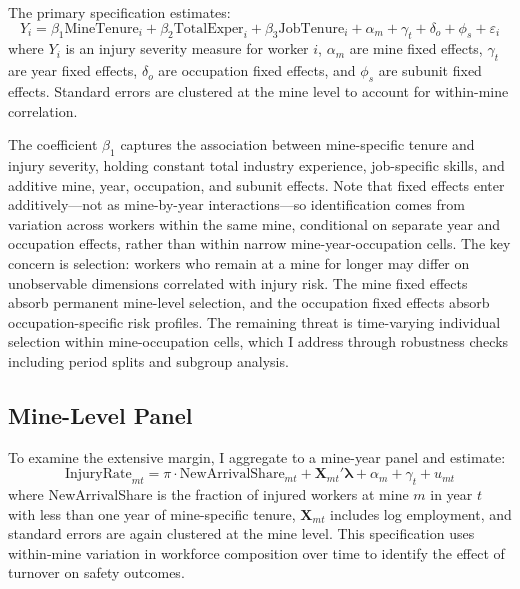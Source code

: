 \documentclass[12pt]{article}
\begin{document}
The primary specification estimates:
\begin{equation}\label{eq:main}
Y_i = \beta_1 \text{MineTenure}_i + \beta_2 \text{TotalExper}_i + \beta_3 \text{JobTenure}_i + \alpha_m + \gamma_t + \delta_o + \phi_s + \varepsilon_i
\end{equation}
where $Y_i$ is an injury severity measure for worker $i$, $\alpha_m$ are mine fixed effects, $\gamma_t$ are year fixed effects, $\delta_o$ are occupation fixed effects, and $\phi_s$ are subunit fixed effects. Standard errors are clustered at the mine level to account for within-mine correlation.

The coefficient $\beta_1$ captures the association between mine-specific tenure and injury severity, holding constant total industry experience, job-specific skills, and additive mine, year, occupation, and subunit effects. Note that fixed effects enter additively---not as mine-by-year interactions---so identification comes from variation across workers within the same mine, conditional on separate year and occupation effects, rather than within narrow mine-year-occupation cells. The key concern is selection: workers who remain at a mine for longer may differ on unobservable dimensions correlated with injury risk. The mine fixed effects absorb permanent mine-level selection, and the occupation fixed effects absorb occupation-specific risk profiles. The remaining threat is time-varying individual selection within mine-occupation cells, which I address through robustness checks including period splits and subgroup analysis.

\subsection{Mine-Level Panel}

To examine the extensive margin, I aggregate to a mine-year panel and estimate:
\begin{equation}\label{eq:panel}
\text{InjuryRate}_{mt} = \pi \cdot \text{NewArrivalShare}_{mt} + \mathbf{X}_{mt}'\boldsymbol{\lambda} + \alpha_m + \gamma_t + u_{mt}
\end{equation}
where NewArrivalShare is the fraction of injured workers at mine $m$ in year $t$ with less than one year of mine-specific tenure, $\mathbf{X}_{mt}$ includes log employment, and standard errors are again clustered at the mine level. This specification uses within-mine variation in workforce composition over time to identify the effect of turnover on safety outcomes.
\end{document}
